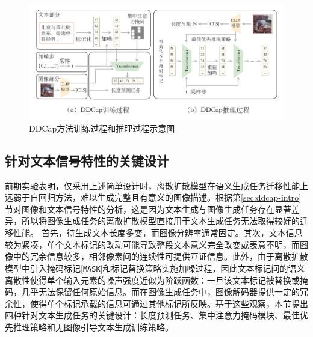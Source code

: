 \begin{figure}
  \centering
  \includegraphics[width=1.0\linewidth]{figures/ddcap-train-inference.pdf}
  \caption{DDCap方法训练过程和推理过程示意图}
  \label{fig:ddcap-train-inference}
\end{figure}

\subsection{针对文本信号特性的关键设计}
\label{sec:ddcap-key-design}
前期实验表明，仅采用上述简单设计时，离散扩散模型在语义生成任务迁移性能上远弱于自回归方法，难以生成完整且有意义的图像描述。根据第\ref{sec:ddcap-intro}节对图像和文本信号特性的分析，这是因为文本生成与图像生成任务存在显著差异，所以将图像生成任务的离散扩散模型直接用于文本生成任务无法取得较好的迁移性能。
首先，待生成文本长度多变，而图像分辨率通常固定。其次，文本信息较为紧凑，单个文本标记的改动可能导致整段文本意义完全改变或表意不明，而图像中的冗余信息较多，相邻像素间的连续性可提供互证信息。此外，由于离散扩散模型中引入掩码标记[\texttt{MASK}]和标记替换策略实施加噪过程，因此文本标记间的语义离散性使得单个输入元素的噪声强度近似为阶跃函数：一旦该文本标记被替换或掩码，几乎无法保留任何原始信息。而在图像生成任务中，图像解码器提供一定的冗余性，使得单个标记承载的信息可通过其他标记所反映。基于这些观察，本节提出四种针对文本生成任务的关键设计：长度预测任务、集中注意力掩码模块、最佳优先推理策略和无图像引导文本生成训练策略。


